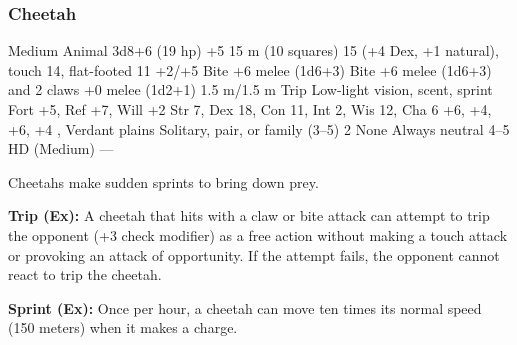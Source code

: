 \subsubsection{Cheetah}
\begin{MonsterStats}
{Medium Animal}
{3d8+6 (19 hp)}
{+5}
{15 m (10 squares)}
{15 (+4 Dex, +1 natural), touch 14, flat-footed 11}
{+2/+5}
{Bite +6 melee (1d6+3)}
{Bite +6 melee (1d6+3) and 2 claws +0 melee (1d2+1)}
{1.5 m/1.5 m}
{Trip}
{Low-light vision, scent, sprint}
{Fort +5, Ref +7, Will +2}
{Str 7, Dex 18, Con 11, Int 2, Wis 12, Cha 6}
{ +6,  +4,  +6,  +4}
{, }
{Verdant plains}
{Solitary, pair, or family (3--5)}
{2}
{None}
{Always neutral}
{4--5 HD (Medium)}
{---}
\end{MonsterStats}


Cheetahs make sudden sprints to bring down prey.

\textbf{Trip (Ex):} A cheetah that hits with a claw or bite attack can attempt to trip the opponent (+3 check modifier) as a free action without making a touch attack or provoking an attack of opportunity. If the attempt fails, the opponent cannot react to trip the cheetah.

\textbf{Sprint (Ex):} Once per hour, a cheetah can move ten times its normal speed (150 meters) when it makes a charge.
